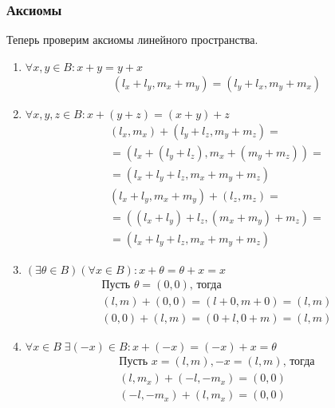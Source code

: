 \subsubsection*{Аксиомы}
Теперь проверим аксиомы линейного пространства.
\begin{enumerate}
    \item {
          $\forall x, y \in B: x + y  = y + x$
          \begin{align*}
              \left(l_x + l_y, m_x + m_y\right) = \left(l_y + l_x, m_y + m_x\right)
          \end{align*}
          }
    \item {
          $\forall x,y,z \in B: x + (y + z) = (x + y) + z$
          \begin{align*}
              \left(l_x, m_x\right) + \left(l_y + l_z, m_y + m_z\right) = \\
              =\left(l_x + (l_y + l_z), m_x + (m_y + m_z)\right) =        \\
              =\left(l_x + l_y + l_z, m_x + m_y + m_z\right)
          \end{align*}
          \begin{align*}
              \left(l_x + l_y, m_x + m_y\right) + \left(l_z, m_z\right) = \\
              =\left((l_x + l_y) + l_z, (m_x + m_y) + m_z\right) =        \\
              =\left(l_x + l_y + l_z, m_x + m_y + m_z\right)
          \end{align*}
          }
    \item {
          $(\exists \theta \in B)(\forall x \in B): x + \theta = \theta + x = x$
          \begin{align*}
              \text{Пусть }\theta = (0, 0)\text{, тогда}       \\
              ( l,m) + (0, 0) = \left(l+0,m + 0\right) = (l,m) \\
              (0,0) + (l,m) = \left(0+l,0 + m\right) = (l,m)
          \end{align*}
          }
    \item {
          $\forall x \in B \; \exists (-x) \in B:x+(-x)=(-x)+x=\theta$
          \begin{align*}
              \text{Пусть }x = (l,m), -x = (l, m)\text{, тогда} \\
              (l,m_x) + (-l,-m_x) =(0,0)                        \\
              (-l,-m_x) + (l,m_x) =(0,0)
          \end{align*}
}
\end{enumerate}
